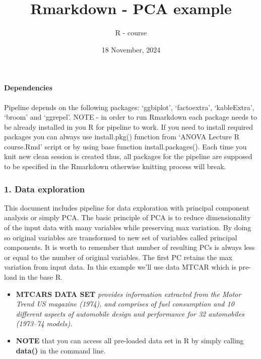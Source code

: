 \documentclass[
  5pt,
]{article}
\title{Rmarkdown - PCA example}
\author{R - course}
\date{18 November, 2024}
\begin{document}
\maketitle

\paragraph{Dependencies}\label{dependencies}

Pipeline depends on the following packages: `ggbiplot', `factoextra',
`kableExtra', `broom' and `ggrepel'. NOTE - in order to run Rmarkdown
each package needs to be already installed in you R for pipeline to
work. If you need to install required packages you can always use
install.pkg() function from `ANOVA Lecture R course.Rmd' script or by
using base function install.packages(). Each time you knit new clean
session is created thus, all packages for the pipeline are supposed to
be specified in the Rmarkdown otherwise knitting process will break.

\subsubsection{1. Data exploration}\label{data-exploration}

This document includes pipeline for data exploration with principal
component analysis or simply PCA. The basic principle of PCA is to
reduce dimensionality of the input data with many variables while
preserving max variation. By doing so original variables are transformed
to new set of variables called principal components. It is worth to
remember that number of resulting PCs is always less or equal to the
number of original variables. The first PC retains the max variation
from input data. In this example we'll use data MTCAR which is pre-load
in the base R.

\begin{itemize}
\item
  \textbf{MTCARS DATA SET} \emph{provides information extracted from the
  Motor Trend US magazine (1974), and comprises of fuel consumption and
  10 different aspects of automobile design and performance for 32
  automobiles (1973--74 models).}
\item
  \textbf{NOTE} that you can access all pre-loaded data set in R by
  simply calling \textbf{data()} in the command line.
\end{itemize}
\end{document}
